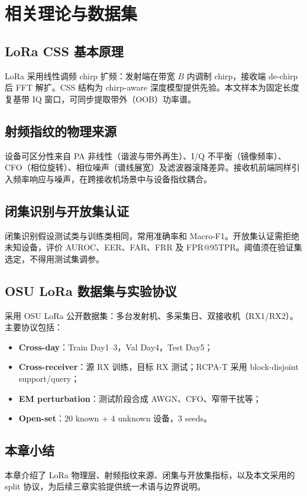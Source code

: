 \chapter{相关理论与数据集}
\label{ch:background}

\section{LoRa CSS 基本原理}

LoRa 采用线性调频 chirp 扩频：发射端在带宽 $B$ 内调制 chirp，接收端 de-chirp 后 FFT 解扩。CSS 结构为 chirp-aware 深度模型提供先验。本文样本为固定长度复基带 IQ 窗口，可同步提取带外（OOB）功率谱。

\section{射频指纹的物理来源}

设备可区分性来自 PA 非线性（谐波与带外再生）、I/Q 不平衡（镜像频率）、CFO（相位旋转）、相位噪声（谱线展宽）及滤波器滚降差异。接收机前端同样引入频率响应与噪声，在跨接收机场景中与设备指纹耦合。

\section{闭集识别与开放集认证}

闭集识别假设测试类与训练类相同，常用准确率和 Macro-F1。开放集认证需拒绝未知设备，评价 AUROC、EER、FAR、FRR 及 FPR@95TPR。阈值须在验证集选定，不得用测试集调参。

\section{OSU LoRa 数据集与实验协议}

采用 OSU LoRa 公开数据集：多台发射机、多采集日、双接收机（RX1/RX2）。主要协议包括：

\begin{itemize}
  \item \textbf{Cross-day}：Train Day1--3，Val Day4，Test Day5；
  \item \textbf{Cross-receiver}：源 RX 训练，目标 RX 测试；RCPA-T 采用 block-disjoint support/query；
  \item \textbf{EM perturbation}：测试阶段合成 AWGN、CFO、窄带干扰等；
  \item \textbf{Open-set}：20 known + 4 unknown 设备，3 seeds。
\end{itemize}

\section{本章小结}

本章介绍了 LoRa 物理层、射频指纹来源、闭集与开放集指标，以及本文采用的 split 协议，为后续三章实验提供统一术语与边界说明。

